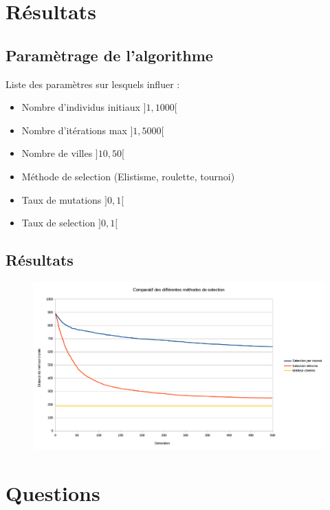 \documentclass{article}
\begin{document}
\section{Résultats}
	\subsection{Paramètrage de l'algorithme}

	Liste des paramètres sur lesquels influer :
	\begin{itemize}
	\item Nombre d'individus initiaux $]1,1000[$
	\item Nombre d'itérations max $]1,5000[$
	\item Nombre de villes $]10,50[$
	\item Méthode de selection (Elistisme, roulette, tournoi)
	\item Taux de mutations $]0,1[$
	\item Taux de selection $]0,1[$
	\end{itemize}

	\subsection{Résultats}

	\begin{figure}
		\begin{center}
			\includegraphics[scale=0.4]{comparatif.png}
		\end{center}
	\end{figure}

\section{Questions}
\end{document}
